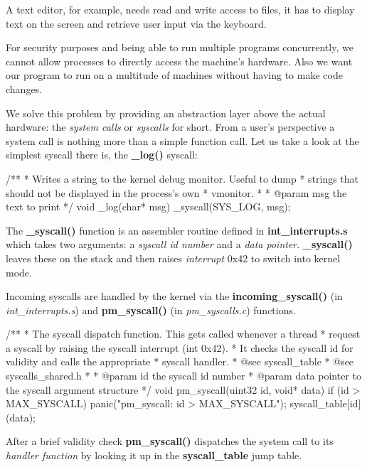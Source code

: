 \documentclass[11pt,a4paper]{scrartcl}
\begin{document}
A text editor, for example, needs read and write access to files, it has to display text on the screen and retrieve user input via the keyboard.

For security purposes and being able to run multiple programs concurrently, we cannot allow processes to directly access the machine's hardware. Also we want our program to run on a multitude of machines without having to make code changes.

We solve this problem by providing an abstraction layer above the actual hardware: the \textit{system calls} or \textit{syscalls} for short. From a user's perspective a system call is nothing more than a simple function call. Let us take a look at the simplest syscall there is, the \textbf{\_log()} syscall:

\begin{code}
/**
 * Writes a string to the kernel debug monitor. Useful to dump
 * strings that should not be displayed in the process's own
 * vmonitor.
 * 
 * @param msg the text to print
 */
void _log(char* msg)
{
	_syscall(SYS_LOG, msg);
}
\end{code}

The \textbf{\_syscall()} function is an assembler routine defined in \textbf{int\_interrupts.s} which takes two arguments: a \textit{syscall id number} and a \textit{data pointer}. \textbf{\_syscall()} leaves these on the stack and then raises \textit{interrupt} 0x42 to switch into kernel mode.

Incoming syscalls are handled by the kernel via the \textbf{incoming\_syscall()} (in \textit{ int\_interrupts.s}) and \textbf{pm\_syscall()} (in \textit{pm\_syscalls.c}) functions.

\begin{code}[pm\_syscalls.c]
/**
 * The syscall dispatch function. This gets called whenever a thread
 * request a syscall by raising the syscall interrupt (int 0x42).
 * It checks the syscall id for validity and calls the appropriate
 * syscall handler.
 * @see syscall_table
 * @see syscalls_shared.h
 * 
 * @param id the syscall id number
 * @param data pointer to the syscall argument structure
 */
void pm_syscall(uint32 id, void* data)
{
	if (id > MAX_SYSCALL) {
		panic("pm_syscall: id > MAX_SYSCALL");
	}
	syscall_table[id](data);
}
\end{code}

After a brief validity check \textbf{pm\_syscall()} dispatches the system call to its \textit{handler function} by looking it up in the \textbf{syscall\_table} jump table.
\end{document}
